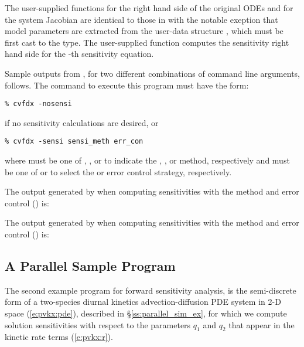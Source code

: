 The user-supplied functions  for the right hand side of the original ODEs and
 for the system Jacobian are identical to those in  with the 
notable exeption that model parameters are extracted from the user-data structure
, which must be first cast to the  type. The user-supplied
function  computes the sensitivity right hand side for the -th 
sensitivity equation.

Sample outputs from , for two different combinations of command line arguments, 
follows. The command to execute this program must have the form:
\begin{verbatim}
% cvfdx -nosensi
\end{verbatim} 
if no sensitivity calculations are desired, or
\begin{verbatim}
% cvfdx -sensi sensi_meth err_con
\end{verbatim}
where  must be one of , , or  to
indicate the , , or  method,
respectively and  must be one of  or  to
select the  or  error control strategy, respectively.

The output generated by  when computing sensitivities with the 
method and  error control () is:
{\small}

The output generated by  when computing sensitivities with the 
method and  error control () is:
{\small}


\subsection{A Parallel Sample Program}\label{ss:parallel_fwd_ex}

The second example program for forward sensitivity analysis,  is the
semi-discrete form of a two-species diurnal kinetics advection-diffusion PDE 
system in 2-D space (\ref{e:pvkx:pde}), described in \S\ref{ss:parallel_sim_ex}, 
for which we compute solution sensitivities with respect to the parameters $q_1$ 
and $q_2$ that appear in the kinetic rate terms (\ref{e:pvkx:r}).

